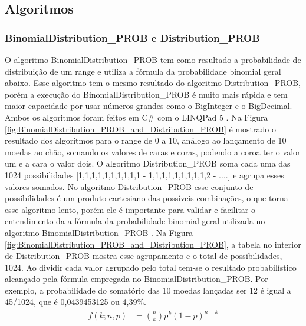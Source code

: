 \begin{apendicesenv}
\chapter{Algoritmos}
\label{app:algoritmos}
\subsection*{BinomialDistribution\_PROB e Distribution\_PROB}
O algoritmo BinomialDistribution\_PROB tem como resultado a probabilidade de distribuição de um range e utiliza a fórmula  da probabilidade binomial geral abaixo. Esse algoritmo tem o mesmo resultado do algoritmo Distribution\_PROB, porém a execução do BinomialDistribution\_PROB é muito mais rápida e tem maior capacidade por usar números grandes como o BigInteger e o BigDecimal. Ambos os algoritmos foram feitos em C\# com o LINQPad 5 \footnotemark. Na Figura \ref{fig:BinomialDistribution_PROB_and_Distribution_PROB} é mostrado o resultado dos algoritmos para o range de 0 a 10, análogo ao lançamento de 10 moedas ao chão, somando os valores de caras e coras, podendo a coroa ter o valor um e a cara o valor dois. O algoritmo Distribution\_PROB soma cada uma das 1024 possibilidades [1,1,1,1,1,1,1,1,1,1 - 1,1,1,1,1,1,1,1,1,2 - ....] e agrupa esses valores somados. No algoritmo Distribution\_PROB esse conjunto de possibilidades é um produto cartesiano das possíveis combinações, o que torna esse algoritmo lento, porém ele é importante para validar e facilitar o entendimento da a fórmula da probabilidade binomial geral utilizada no algoritmo BinomialDistribution\_PROB \cite{mathisfun_binomial_distribution}. Na Figura \ref{fig:BinomialDistribution_PROB_and_Distribution_PROB}, a tabela no interior de  Distribution\_PROB mostra esse agrupamento e o total de possibilidades, 1024. Ao dividir cada valor agrupado pelo total tem-se o resultado probabilístico alcançado pela fórmula empregada no BinomialDistribution\_PROB. Por exemplo, a probabilidade do somatório das 10 moedas lançadas ser 12 é igual a 45/1024, que é 0,0439453125 ou 4,39\%.
	\begin{align*}
	f(k;n,p) &= \binom{n}{k} p^k(1 - p)^{n-k}
	\end{align*}

\end{apendicesenv}
